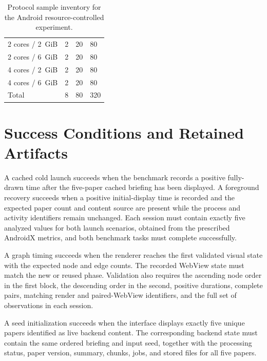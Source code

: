 \begin{table}[htbp]
\centering
\caption{Protocol sample inventory for the Android resource-controlled experiment.}
\label{tab:android-factorial-inventory}
\begin{tabular}{P{3.0cm}P{2.4cm}P{3.2cm}P{3.2cm}}
\toprule
{} &  &
 &  \\
 cores / 2~GiB & 2 & 20 & 80 \\
2 cores / 6~GiB & 2 & 20 & 80 \\
4 cores / 2~GiB & 2 & 20 & 80 \\
4 cores / 6~GiB & 2 & 20 & 80 \\
\midrule
Total & 8 & 80 & 320 \\
\bottomrule
\end{tabular}
\end{table}
\FloatBarrier

\section{Success Conditions and Retained Artifacts}

A cached cold launch succeeds when the benchmark records a positive
fully-drawn time after the five-paper cached briefing has been displayed. A
foreground recovery succeeds when a positive initial-display time is recorded
and the expected paper count and content source are present while the process
and activity identifiers remain unchanged. Each session must contain exactly
five analyzed values for both launch scenarios, obtained from the prescribed
AndroidX metrics, and both benchmark tasks must complete successfully.

A graph timing succeeds when the renderer reaches the first validated visual
state with the expected node and edge counts. The recorded WebView state must
match the new or reused phase. Validation also requires the ascending node
order in the first block, the descending order in the second, positive
durations, complete pairs, matching render and paired-WebView identifiers, and
the full set of observations in each session.

A seed initialization succeeds when the interface displays exactly five unique
papers identified as live backend content. The corresponding backend state
must contain the same ordered briefing and input seed, together with the
processing status, paper version, summary, chunks, jobs, and stored files for
all five papers.

